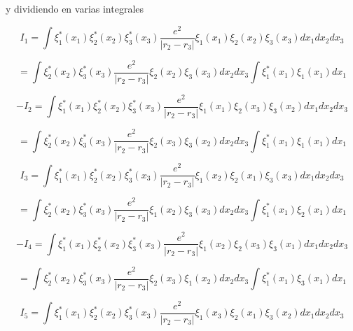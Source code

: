 \documentclass[12pt,a4paper]{article}
\begin{document}
\begin{enumerate}
\begin{enumerate}
    y dividiendo en varias integrales
    
    \begin{equation*}
        I_1 =\int \xi_{1}^{*}(x_1) \xi_{2}^{*}(x_2) \xi_{3}^{*}(x_3)\frac{e^2}{|r_2 -r_3|}\xi_1 (x_1) \xi_2(x_2) \xi_3 (x_3) dx_1 dx_2 dx_3
    \end{equation*}
    
    \begin{equation*}
        =\int \xi_{2}^{*}(x_2) \xi_{3}^{*}(x_3)\frac{e^2}{|r_2 -r_3|} \xi_2(x_2) \xi_3 (x_3)  dx_2 dx_3 \int \xi_{1}^{*}(x_1)\xi_1 (x_1) dx_1
    \end{equation*}
    
    
    \begin{equation*}
        -I_2 =\int \xi_{1}^{*}(x_1) \xi_{2}^{*}(x_2) \xi_{3}^{*}(x_3)\frac{e^2}{|r_2 -r_3|}\xi_1 (x_1) \xi_2(x_3) \xi_3 (x_2) dx_1 dx_2 dx_3
    \end{equation*}
    
    \begin{equation*}
        =\int \xi_{2}^{*}(x_2) \xi_{3}^{*}(x_3)\frac{e^2}{|r_2 -r_3|} \xi_2(x_3) \xi_3 (x_2)  dx_2 dx_3 \int \xi_{1}^{*}(x_1)\xi_1 (x_1) dx_1
    \end{equation*}
    
    
    \begin{equation*}
        I_3 =\int \xi_{1}^{*}(x_1) \xi_{2}^{*}(x_2) \xi_{3}^{*}(x_3)\frac{e^2}{|r_2 -r_3|}\xi_1 (x_2) \xi_2(x_1) \xi_3 (x_3) dx_1 dx_2 dx_3
    \end{equation*}
    
    \begin{equation*}
        =\int \xi_{2}^{*}(x_2) \xi_{3}^{*}(x_3)\frac{e^2}{|r_2 -r_3|} \xi_1(x_2) \xi_3 (x_3)  dx_2 dx_3 \int \xi_{1}^{*}(x_1)\xi_2 (x_1) dx_1
    \end{equation*}
    
    \begin{equation*}
        -I_4 =\int \xi_{1}^{*}(x_1) \xi_{2}^{*}(x_2) \xi_{3}^{*}(x_3)\frac{e^2}{|r_2 -r_3|}\xi_1 (x_2) \xi_2(x_3) \xi_3 (x_1) dx_1 dx_2 dx_3
    \end{equation*}
    
    \begin{equation*}
        =\int \xi_{2}^{*}(x_2) \xi_{3}^{*}(x_3)\frac{e^2}{|r_2 -r_3|} \xi_2(x_3) \xi_1 (x_2)  dx_2 dx_3 \int \xi_{1}^{*}(x_1)\xi_3 (x_1) dx_1
    \end{equation*}
    
    \begin{equation*}
        I_5 =\int \xi_{1}^{*}(x_1) \xi_{2}^{*}(x_2) \xi_{3}^{*}(x_3)\frac{e^2}{|r_2 -r_3|}\xi_1 (x_3) \xi_2(x_1) \xi_3 (x_2) dx_1 dx_2 dx_3
    \end{equation*}
    

\end{enumerate}
\end{enumerate}
\end{document}
